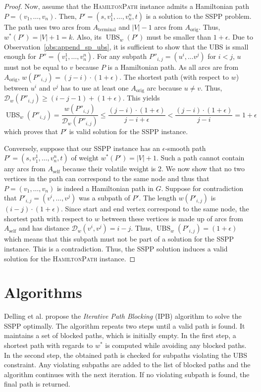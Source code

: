 \documentclass[a4paper,UKenglish,cleveref, autoref, thm-restate]{lipics-v2021}
\newcommand*{\dist}{\mathcal{D}}
\newcommand*{\ubs}{\operatorname{UBS}}
\begin{document}
\begin{proof}
Now, assume that the \textsc{HamiltonPath} instance admits a Hamiltonian path $P = (v_1, \dots, v_n)$.
Then, $P' = (s, v_1^1, \dots, v_n^n, t)$ is a solution to the SSPP problem.
The path uses two arcs from $A_{\operatorname{terminal}}$ and $|V|-1$ arcs from $A_{\operatorname{orig}}$.
Thus, $w^{*}(P') = |V| + 1 = k$.
Also, its $\ubs_w(P')$ must be smaller than $1+\epsilon$.
Due to Observation~\ref{obs:append_sp_ubs}, it is sufficient to show that the UBS is small enough for $P'' = (v_1^1, \dots, v_n^n)$.
For any subpath $P''_{i,j} = (u^i, \dots v^j)$ for $i < j$, $u$ must not be equal to $v$ because $P$ is a Hamiltonian path.
As all arcs are from $A_{\operatorname{orig}}$, $w(P''_{i,j}) = (j-i) \cdot (1+\epsilon)$.
The shortest path (with respect to $w$) between $u^i$ and $v^j$ has to use at least one $A_{\operatorname{orig}}$ arc because $u \neq v$.
Thus, $\dist_w(P''_{i,j}) \geq (i - j - 1) + (1 + \epsilon)$.
This yields
\[
\ubs_w(P''_{i,j}) = \frac{w(P''_{i,j})}{\dist_w(P''_{i,j})} \leq \frac{(j-i) \cdot (1+\epsilon)}{j-i+\epsilon} < \frac{(j-i) \cdot (1+\epsilon)}{j-i} = 1 + \epsilon
\]
which proves that $P'$ is valid solution for the SSPP instance.

Conversely, suppose that our SSPP instance has an $\epsilon$-smooth path $P' = (s, v_1^1, \dots, v_n^n, t)$ of weight $w^*(P') = |V|+1$.
Such a path cannot contain any arcs from $A_{\operatorname{self}}$ because their volatile weight is 2.
We now show that no two vertices in the path can correspond to the same node and thus that $P = (v_1, \dots, v_n)$ is indeed a Hamiltonian path in $G$.
Suppose for contradiction that $P'_{i,j} = (v^i, \dots, v^j)$ was a subpath of $P'$.
The length $w(P'_{i,j})$ is $(i-j) \cdot (1+\epsilon)$.
Since start and end vertex correspond to the same node, the shortest path with respect to $w$ between these vertices is made up of arcs from $A_{\operatorname{self}}$ and has distance $\dist_w(v^i, v^j) = i-j$.
Thus, $\ubs_w(P'_{i,j}) = (1+\epsilon)$ which means that this subpath must not be part of a solution for the SSPP instance.
This is a contradiction.
Thus, the SSPP solution induces a valid solution for the \textsc{HamiltonPath} instance.
\end{proof}

\section{Algorithms}\label{sec:algos}

Delling et al. propose the \emph{Iterative Path Blocking} (IPB) algorithm to solve the SSPP optimally.
The algorithm repeats two steps until a valid path is found.
It maintains a set of blocked paths, which is initially empty.
In the first step, a shortest path with regards to $w^*$ is computed while avoiding any blocked paths.
In the second step, the obtained path is checked for subpaths violating the UBS constraint.
Any violating subpaths are added to the list of blocked paths and the algorithm continues with the next iteration.
If no violating subpath is found, the final path is returned.
\end{document}
